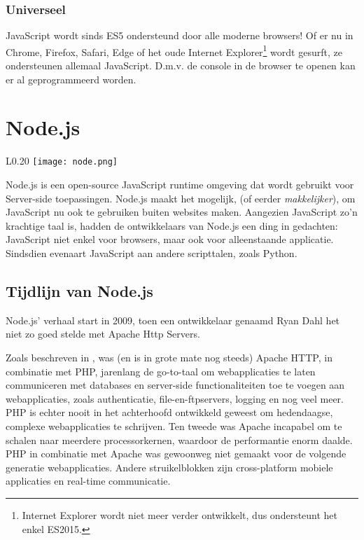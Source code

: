 \subsubsection{Universeel}
\label{sec:universal}

JavaScript wordt sinds ES5 ondersteund door alle moderne browsers! Of er nu in Chrome, Firefox, Safari, Edge of het oude Internet Explorer\footnote{Internet Explorer wordt niet meer verder ontwikkelt, dus ondersteunt het enkel ES2015.} wordt gesurft, ze ondersteunen allemaal JavaScript. D.m.v. de console in de browser te openen kan er al geprogrammeerd worden.





\section{Node.js}
\label{sec:nodeJs}

\begin{wrapfigure}{L}{0.20\textwidth}
	\texttt{[image: node.png]}
\end{wrapfigure}Node.js is een open-source JavaScript runtime omgeving dat wordt gebruikt voor Server-side toepassingen. Node.js maakt het mogelijk, (of eerder \textit{makkelijker}), om JavaScript nu ook te gebruiken buiten websites maken. Aangezien JavaScript zo'n krachtige taal is, hadden de ontwikkelaars van Node.js een ding in gedachten: JavaScript niet enkel voor browsers, maar ook voor alleenstaande applicatie. Sindsdien evenaart JavaScript aan andere scripttalen, zoals Python. \textcite{Patel2018}

\subsection{Tijdlijn van Node.js}
\label{sec:nodeTimeline}
Node.js' verhaal start in 2009, toen een ontwikkelaar genaamd Ryan Dahl het niet zo goed stelde met Apache Http Servers. 

Zoals beschreven in \autocite{Chaniotis2015}, was (en is in grote mate nog steeds) Apache HTTP, in combinatie met PHP, jarenlang de go-to-taal om webapplicaties te laten communiceren met databases en server-side functionaliteiten toe te voegen aan webapplicaties, zoals authenticatie, file-en-ftpservers, logging en nog veel meer. PHP is echter nooit in het achterhoofd ontwikkeld geweest om hedendaagse, complexe webapplicaties te schrijven. Ten tweede was Apache incapabel om te schalen naar meerdere processorkernen, waardoor de performantie enorm daalde. PHP in combinatie met Apache was gewoonweg niet gemaakt voor de volgende generatie webapplicaties. Andere struikelblokken zijn cross-platform mobiele applicaties en real-time communicatie.

